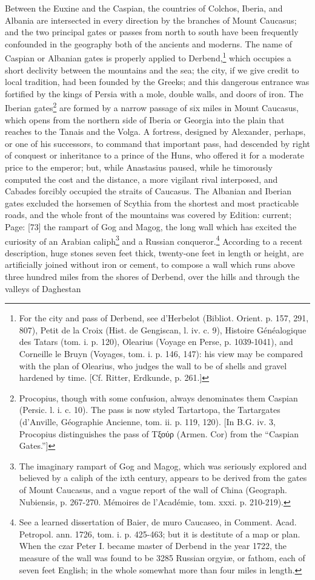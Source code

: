 Between the Euxine and the Caspian, the countries of Colchos, Iberia, and Albania are intersected in every direction by the branches of Mount Caucasus; and the two principal gates or passes from north to south have been frequently confounded in the geography both of the ancients and moderns. The name of Caspian or Albanian gates is properly applied to Derbend,\footnote{For the city and pass of Derbend, see d\texthebrew{}’Herbelot (Bibliot. Orient. p. 157, 291, 807), Petit de la Croix (Hist. de Gengiscan, l. iv. c. 9), Histoire Généalogique des Tatars (tom. i. p. 120), Olearius (Voyage en Perse, p. 1039-1041), and Corneille le Bruyn (Voyages, tom. i. p. 146, 147): his view may be compared with the plan of Olearius, who judges the wall to be of shells and gravel hardened by time. [Cf. Ritter, Erdkunde, p. 261.]} which occupies a short declivity between the mountains and the sea; the city, if we give credit to local tradition, had been founded by the Greeks; and this dangerous entrance was fortified by the kings of Persia with a mole, double walls, and doors of iron. The Iberian gates\footnote{Procopius, though with some confusion, always denominates them Caspian (Persic. l. i. c. 10). The pass is now styled Tartartopa, the Tartargates (d\texthebrew{}’Anville, Géographie Ancienne, tom. ii. p. 119, 120). [In B.G. iv. 3, Procopius distinguishes the pass of \textgreek{Τξούρ} (Armen. Cor) from the \texthebrew{“}Caspian Gates.\texthebrew{}”]} are formed by a narrow passage of six miles in Mount Caucasus, which opens from the northern side of Iberia or Georgia into the plain that reaches to the Tanais and the Volga. A fortress, designed by Alexander, perhaps, or one of his successors, to command that important pass, had descended by right of conquest or inheritance to a prince of the Huns, who offered it for a moderate price to the emperor; but, while Anastasius paused, while he timorously computed the cost and the distance, a more vigilant rival interposed, and Cabades forcibly occupied the straits of Caucasus. The Albanian and Iberian gates excluded the horsemen of Scythia from the shortest and most practicable roads, and the whole front of the mountains was covered by Edition: current; Page: [73] the rampart of Gog and Magog, the long wall which has excited the curiosity of an Arabian caliph\footnote{The imaginary rampart of Gog and Magog, which was seriously explored and believed by a caliph of the ixth century, appears to be derived from the gates of Mount Caucasus, and a vague report of the wall of China (Geograph. Nubiensis, p. 267-270. Mémoires de l\texthebrew{}’Académie, tom. xxxi. p. 210-219).} and a Russian conqueror.\footnote{See a learned dissertation of Baier, de muro Caucaseo, in Comment. Acad. Petropol. ann. 1726, tom. i. p. 425-463; but it is destitute of a map or plan. When the czar Peter I. became master of Derbend in the year 1722, the measure of the wall was found to be 3285 Russian orgyiæ, or fathom, each of seven feet English; in the whole somewhat more than four miles in length.} According to a recent description, huge stones seven feet thick, twenty-one feet in length or height, are artificially joined without iron or cement, to compose a wall which runs above three hundred miles from the shores of Derbend, over the hills and through the valleys of Daghestan 